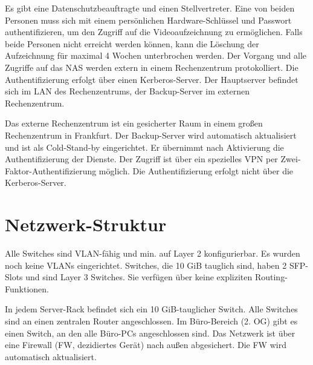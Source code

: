 \documentclass[a4paper,10pt]{scrreprt}
\begin{document}
Es gibt eine Datenschutzbeauftragte und einen Stellvertreter. Eine von beiden Personen muss sich mit einem persönlichen Hardware-Schlüssel und Passwort authentifizieren, um den Zugriff auf die Videoaufzeichnung zu ermöglichen. Falls beide Personen nicht erreicht werden können, kann die Löschung der Aufzeichnung für maximal 4 Wochen unterbrochen werden. Der Vorgang und alle Zugriffe auf das NAS werden extern in einem Rechenzentrum protokolliert. Die Authentifizierung erfolgt über einen Kerberos-Server. Der Hauptserver befindet sich im LAN des Rechenzentrums, der Backup-Server im externen Rechenzentrum.

Das externe Rechenzentrum ist ein gesicherter Raum in einem großen Rechenzentrum in Frankfurt. Der Backup-Server wird automatisch aktualisiert und ist als Cold-Stand-by eingerichtet. Er übernimmt nach Aktivierung die Authentifizierung der Dienste. Der Zugriff ist über ein spezielles VPN per Zwei-Faktor-Authentifizierung möglich. Die Authentifizierung erfolgt nicht über die Kerberos-Server.

\section{Netzwerk-Struktur}
Alle Switches sind VLAN-fähig und min. auf Layer 2 konfigurierbar. Es wurden noch keine VLANs eingerichtet. Switches, die 10 GiB tauglich sind, haben 2 SFP-Slots und sind Layer 3 Switches. Sie verfügen über keine expliziten Routing-Funktionen.

In jedem Server-Rack befindet sich ein 10 GiB-tauglicher Switch. Alle Switches sind an einen zentralen Router angeschlossen. Im Büro-Bereich (2. OG) gibt es einen Switch, an den alle Büro-PCs angeschlossen sind. Das Netzwerk ist über eine Firewall (FW, dezidiertes Gerät) nach außen abgesichert. Die FW wird automatisch aktualisiert.
\end{document}

